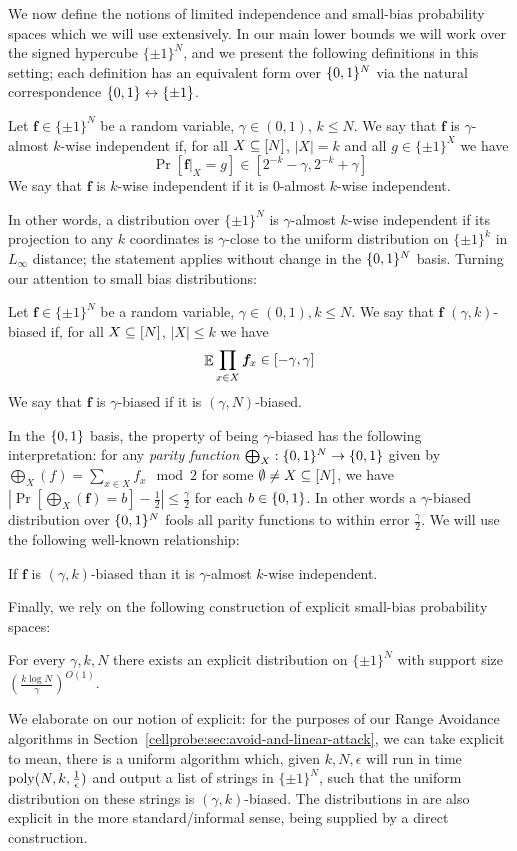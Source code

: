 We now define the notions of limited independence and small-bias probability spaces which we will use extensively. In our main lower bounds we will work over the signed hypercube $\{\pm 1\}^N$, and we present the following definitions in this setting; each definition has an equivalent form over $\{0,1\}^N$ via the natural correspondence $\{0,1\} \leftrightarrow\{\pm 1\}$. 
\begin{definition}
Let $\bm{f}\in \{\pm 1\}^N$ be a random variable, $\gamma\in (0,1)$, $k \leq N$. We say that $\bm{f}$ is $\gamma$-almost $k$-wise independent if, for all $X \subseteq [N]$, $|X|= k$ and all $g\in \{\pm 1\}^X$ we have
\[
\Pr[\bm{f}|_{X} = g] \in [2^{-k}-\gamma, 2^{-k}+\gamma]
\]
We say that $\bm{f}$ is $k$-wise independent if it is $0$-almost $k$-wise independent.
\end{definition}
In other words, a distribution over $\{\pm 1\}^N$ is $\gamma$-almost $k$-wise independent if its projection to any $k$ coordinates is $\gamma$-close to the uniform distribution on $\{\pm 1\}^k$ in $L_{\infty}$ distance; the statement applies without change in the $\{0,1\}^N$ basis. Turning our attention to small bias distributions:
\begin{definition}
Let $\bm{f} \in \{\pm 1\}^N$ be a random variable, $\gamma\in (0,1), k \leq N$. We say that $\bm{f}$ $(\gamma,k)$-biased if, for all $X \subseteq [N]$, $|X|\leq k$ we have
\[
\mathop{\mathbb{E}} \prod_{x\in X} \bm{f}_x \in [-\gamma,\gamma]
\]
We say that $\bm{f}$ is $\gamma$-biased if it is $(\gamma,N)$-biased.
\end{definition}
In the $\{0,1\}$ basis, the property of being $\gamma$-biased has the following interpretation: for any \emph{parity function} $\bigoplus_X: \{0,1\}^N \to \{0,1\}$ given by $\bigoplus_X(f) = \sum_{x \in X} f_x \mod 2$ for some $\emptyset \neq X \subseteq [N]$, we have $|\Pr[\bigoplus_X(\bm{f}) = b] - \frac{1}{2}| \leq \frac{\gamma}{2}$ for each $b \in \{0,1\}$. In other words a $\gamma$-biased distribution over $\{0,1\}^N$ fools all parity functions to within error $\frac{\gamma}{2}$. We will use the following well-known relationship:
\begin{lemma}\label{cellprobe:lem:bias-vs-indep}
If $\bm{f}$ is $(\gamma,k)$-biased than it is $\gamma$-almost $k$-wise independent.
\end{lemma}

Finally, we rely on the following construction of explicit small-bias probability spaces:
\begin{theorem*}
For every $\gamma,k,N$ there exists an explicit distribution on $\{\pm 1\}^N$ with support size $(\frac{k\log N}{\gamma})^{O(1)}$.
\end{theorem*}
We elaborate on our notion of explicit: for the purposes of our Range Avoidance algorithms in Section~\ref{cellprobe:sec:avoid-and-linear-attack}, we can take explicit to mean, there is a uniform algorithm which, given $k,N,\epsilon$ will run in time $\mathrm{poly}(N, k, \frac{1}{\epsilon})$ and output a list of strings in $\{\pm 1\}^N$, such that the uniform distribution on these strings is $(\gamma,k)$-biased. The distributions in \cite{naornaor} are also explicit in the more standard/informal sense, being supplied by a direct construction. 

